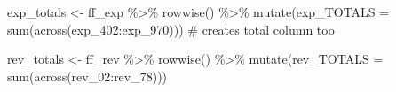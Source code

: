 \documentclass[
  letterpaper,
  DIV=11,
  numbers=noendperiod]{scrreport}
\newenvironment{Shaded}{\begin{snugshade}}{\end{snugshade}}
\newcommand{\AttributeTok}[1]{\textcolor[rgb]{0.40,0.45,0.13}{#1}}
\newcommand{\CommentTok}[1]{\textcolor[rgb]{0.37,0.37,0.37}{#1}}
\newcommand{\FunctionTok}[1]{\textcolor[rgb]{0.28,0.35,0.67}{#1}}
\newcommand{\NormalTok}[1]{\textcolor[rgb]{0.00,0.23,0.31}{#1}}
\newcommand{\OtherTok}[1]{\textcolor[rgb]{0.00,0.23,0.31}{#1}}
\newcommand{\SpecialCharTok}[1]{\textcolor[rgb]{0.37,0.37,0.37}{#1}}
\begin{document}
\begin{Shaded}
\begin{Highlighting}[]
\NormalTok{exp\_totals }\OtherTok{\textless{}{-}}\NormalTok{ ff\_exp }\SpecialCharTok{\%\textgreater{}\%} \FunctionTok{rowwise}\NormalTok{() }\SpecialCharTok{\%\textgreater{}\%} \FunctionTok{mutate}\NormalTok{(}\AttributeTok{exp\_TOTALS =} \FunctionTok{sum}\NormalTok{(}\FunctionTok{across}\NormalTok{(exp\_402}\SpecialCharTok{:}\NormalTok{exp\_970))) }\CommentTok{\# creates total column too}

\NormalTok{rev\_totals }\OtherTok{\textless{}{-}}\NormalTok{ ff\_rev }\SpecialCharTok{\%\textgreater{}\%} \FunctionTok{rowwise}\NormalTok{() }\SpecialCharTok{\%\textgreater{}\%} 
  \FunctionTok{mutate}\NormalTok{(}\AttributeTok{rev\_TOTALS =} \FunctionTok{sum}\NormalTok{(}\FunctionTok{across}\NormalTok{(rev\_02}\SpecialCharTok{:}\NormalTok{rev\_78)))}


\end{Highlighting}
\end{Shaded}
\end{document}
